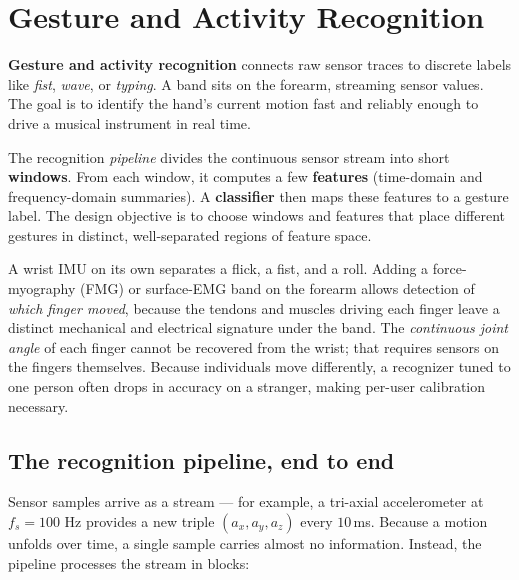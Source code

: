 \chapter{Gesture and Activity Recognition}

\textbf{Gesture and activity recognition} connects raw sensor traces to discrete labels like \emph{fist}, \emph{wave}, or \emph{typing}. A band sits on the forearm, streaming sensor values. The goal is to identify the hand's current motion fast and reliably enough to drive a musical instrument in real time.

The recognition \emph{pipeline} divides the continuous sensor stream into short \textbf{windows}. From each window, it computes a few \textbf{features} (time-domain and frequency-domain summaries). A \textbf{classifier} then maps these features to a gesture label. The design objective is to choose windows and features that place different gestures in distinct, well-separated regions of feature space.

A wrist IMU on its own separates a flick, a fist, and a roll. Adding a force-myography (FMG) or surface-EMG band on the forearm allows detection of \emph{which finger moved}, because the tendons and muscles driving each finger leave a distinct mechanical and electrical signature under the band. The \emph{continuous joint angle} of each finger cannot be recovered from the wrist; that requires sensors on the fingers themselves. Because individuals move differently, a recognizer tuned to one person often drops in accuracy on a stranger, making per-user calibration necessary.

\chapterline

\section{The recognition pipeline, end to end}
\label{ch38:pipeline}

Sensor samples arrive as a stream --- for example, a tri-axial accelerometer at $f_s = 100$ Hz provides a new triple $(a_x, a_y, a_z)$ every $10$\,ms. Because a motion unfolds over time, a single sample carries almost no information. Instead, the pipeline processes the stream in blocks:


